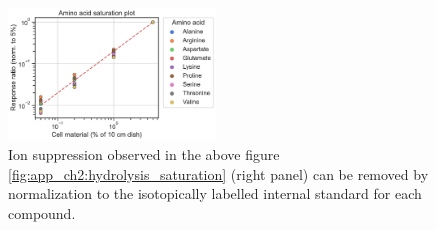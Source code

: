 \begin{figure}[ht]
    \centering
    \includegraphics[width=0.49\textwidth]{figures/chap2/app/hydrolysis_AA_saturation_RR.pdf}
    \caption[Hydrolyzed amino acids normalized with internal standards.]{
    Ion suppression observed in the above figure \ref{fig:app_ch2:hydrolysis_saturation} (right panel) can be removed by normalization to the isotopically labelled internal standard for each compound.
    }
    \label{fig:app_ch2:hydrolysis_AA_saturation_RR}
\end{figure}


